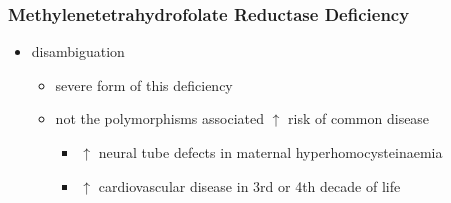\documentclass{scrartcl}
\begin{document}
\subsubsection{Methylenetetrahydrofolate Reductase Deficiency}
\label{sec:orge0ae4a1}
\begin{itemize}
\item disambiguation
\begin{itemize}
\item severe form of this deficiency
\item not the polymorphisms associated \(\uparrow\) risk of common disease
\begin{itemize}
\item \(\uparrow\) neural tube defects in maternal hyperhomocysteinaemia
\item \(\uparrow\) cardiovascular disease in 3rd or 4th decade of life
\end{itemize}
\end{itemize}
\end{itemize}
\end{document}
